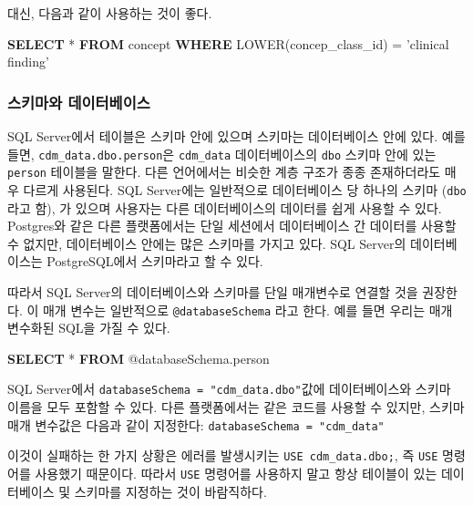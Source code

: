 \documentclass[10.5pt]{book}
\newenvironment{Shaded}{\begin{snugshade}}{\end{snugshade}}
\newcommand{\KeywordTok}[1]{\textcolor[rgb]{0.13,0.29,0.53}{\textbf{#1}}}
\newcommand{\StringTok}[1]{\textcolor[rgb]{0.31,0.60,0.02}{#1}}
\newcommand{\FunctionTok}[1]{\textcolor[rgb]{0.00,0.00,0.00}{#1}}
\newcommand{\NormalTok}[1]{#1}
\theoremstyle{definition}
\theoremstyle{definition}
\theoremstyle{definition}
\theoremstyle{remark}
\begin{document}
대신, 다음과 같이 사용하는 것이 좋다.

\begin{Shaded}
\begin{Highlighting}[]
\KeywordTok{SELECT}\NormalTok{ * }\KeywordTok{FROM}\NormalTok{ concept }\KeywordTok{WHERE} \FunctionTok{LOWER}\NormalTok{(concep_class_id) = }\StringTok{'clinical finding'}
\end{Highlighting}
\end{Shaded}

\subsubsection*{스키마와 데이터베이스}\label{-}

SQL Server에서 테이블은 스키마 안에 있으며 스키마는 데이터베이스 안에
있다. 예를 들면, \texttt{cdm\_data.dbo.person}은 \texttt{cdm\_data}
데이터베이스의 \texttt{dbo} 스키마 안에 있는 \texttt{person} 테이블을
말한다. 다른 언어에서는 비슷한 계층 구조가 종종 존재하더라도 매우 다르게
사용된다. SQL Server에는 일반적으로 데이터베이스 당 하나의 스키마
(\texttt{dbo}라고 함), 가 있으며 사용자는 다른 데이터베이스의 데이터를
쉽게 사용할 수 있다. Postgres와 같은 다른 플랫폼에서는 단일 세션에서
데이터베이스 간 데이터를 사용할 수 없지만, 데이터베이스 안에는 많은
스키마를 가지고 있다. SQL Server의 데이터베이스는 PostgreSQL에서
스키마라고 할 수 있다.

따라서 SQL Server의 데이터베이스와 스키마를 단일 매개변수로 연결할 것을
권장한다. 이 매개 변수는 일반적으로 \texttt{@databaseSchema} 라고 한다.
예를 들면 우리는 매개 변수화된 SQL을 가질 수 있다.

\begin{Shaded}
\begin{Highlighting}[]
\KeywordTok{SELECT}\NormalTok{ * }\KeywordTok{FROM}\NormalTok{ @databaseSchema.person}
\end{Highlighting}
\end{Shaded}

SQL Server에서 \texttt{databaseSchema\ =\ "cdm\_data.dbo"}값에
데이터베이스와 스키마 이름을 모두 포함할 수 있다. 다른 플랫폼에서는 같은
코드를 사용할 수 있지만, 스키마 매개 변수값은 다음과 같이 지정한다:
\texttt{databaseSchema\ =\ "cdm\_data"}

이것이 실패하는 한 가지 상황은 에러를 발생시키는
\texttt{USE\ cdm\_data.dbo;}, 즉 \texttt{USE} 명령어를 사용했기
때문이다. 따라서 \texttt{USE} 명령어를 사용하지 말고 항상 테이블이 있는
데이터베이스 및 스키마를 지정하는 것이 바람직하다.
\end{document}

